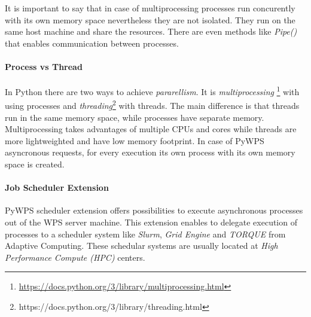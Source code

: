 \documentclass[12pt,a4paper]{article}
\begin{document}
It is important to say that in case of multiprocessing processes run concurently with its own memory space nevertheless they are not isolated.
They run on the same host machine and share the resources. There are even methods like \textit{Pipe()} that enables communication between 
processes.

\paragraph{Process vs Thread} In Python there are two ways to achieve \textit{pararellism}. It is \textit{multiprocessing}
\footnote{\url{https://docs.python.org/3/library/multiprocessing.html}} with using processes and \textit{threading}\footnote{https://docs.python.org/3/library/threading.html} with threads. The main difference is that threads run in the same memory space, while processes
have separate memory. Multiprocessing takes advantages of multiple CPUs and cores while threads are more lightweighted and have low memory
footprint. In case of PyWPS asyncronous requests, for every execution its own process with its own memory space is created.

\paragraph{Job Scheduler Extension}
PyWPS scheduler extension offers possibilities to execute asynchronous processes out of the WPS server machine.
This extension enables to delegate execution of processes to a scheduler system like \textit{Slurm}, \textit{Grid Engine} 
and \textit{TORQUE} from Adaptive Computing. These schedular systems are usually located at \textit{High Performance Compute (HPC)}
centers.

\begin{figure}[h!]
\centering
\begin{floatrow}
\end{floatrow}
\end{figure}
\end{document}
